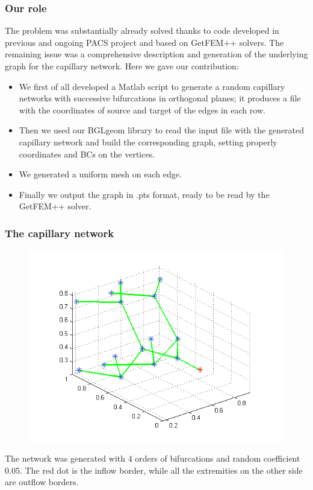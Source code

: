 \documentclass[11pt]{beamer}
\begin{document}
	\begin{frame}
		\frametitle{Our role}
		The problem was substantially already solved thanks to code developed in previous and ongoing PACS project and based on GetFEM++ solvers. The remaining issue was a comprehensive description and generation of the underlying graph for the capillary network. Here we gave our contribution:
		\begin{itemize}
			\item We first of all developed a Matlab script to generate a random capillary networks with successive bifurcations in orthogonal planes; it produces a file with the coordinates of source and target of the edges in each row.
			\item Then we used our BGLgeom library to read the input file with the generated capillary network and build the corresponding graph, setting properly coordinates and BCs on the vertices.
			\item We generated a uniform mesh on each edge.
			\item Finally we output the graph in .pts format, ready to be read by the GetFEM++ solver.
		\end{itemize}	
	\end{frame}
	
	\begin{frame}
		\frametitle{The capillary network}
		\begin{figure}
			\centering
			\includegraphics[width=.65\textwidth]{capillary_network}
		\end{figure}
		The network was generated with 4 orders of bifurcations and random coefficient 0.05. The red dot is the inflow border, while all the extremities on the other side are outflow borders.
	\end{frame}
	
\end{document}
